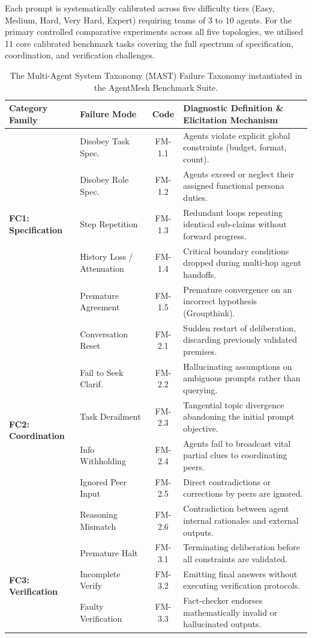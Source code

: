 \documentclass[conference]{IEEEtran}
\newcommand{\fm}[1]{\textsf{FM-#1}} %
\newcommand{\fc}[1]{\textsf{FC#1}}  %
\begin{document}
Each prompt is systematically calibrated across five difficulty tiers (Easy, Medium, Hard, Very Hard, Expert) requiring teams of 3 to 10 agents. For the primary controlled comparative experiments across all five topologies, we utilised 11 core calibrated benchmark tasks covering the full spectrum of specification, coordination, and verification challenges.

\begin{table}[t]
\centering
\small
\caption{The Multi-Agent System Taxonomy (MAST) Failure Taxonomy instantiated in the AgentMesh Benchmark Suite.}
\label{tab:taxonomy_overview}
\begin{tabularx}{\textwidth}{llcX}
\toprule
\textbf{Category Family} & \textbf{Failure Mode} & \textbf{Code} & \textbf{Diagnostic Definition \& Elicitation Mechanism} \\
\midrule
\multirow{5}{*}{\textbf{\fc{1}: Specification}} 
  & Disobey Task Spec.     & \fm{1.1} & Agents violate explicit global constraints (budget, format, count). \\
  & Disobey Role Spec.     & \fm{1.2} & Agents exceed or neglect their assigned functional persona duties. \\
  & Step Repetition        & \fm{1.3} & Redundant loops repeating identical sub-claims without forward progress. \\
  & History Loss / Attenuation & \fm{1.4} & Critical boundary conditions dropped during multi-hop agent handoffs. \\
  & Premature Agreement    & \fm{1.5} & Premature convergence on an incorrect hypothesis (Groupthink). \\
\midrule
\multirow{6}{*}{\textbf{\fc{2}: Coordination}} 
  & Conversation Reset     & \fm{2.1} & Sudden restart of deliberation, discarding previously validated premises. \\
  & Fail to Seek Clarif.   & \fm{2.2} & Hallucinating assumptions on ambiguous prompts rather than querying. \\
  & Task Derailment        & \fm{2.3} & Tangential topic divergence abandoning the initial prompt objective. \\
  & Info Withholding       & \fm{2.4} & Agents fail to broadcast vital partial clues to coordinating peers. \\
  & Ignored Peer Input     & \fm{2.5} & Direct contradictions or corrections by peers are ignored. \\
  & Reasoning Mismatch     & \fm{2.6} & Contradiction between agent internal rationales and external outputs. \\
\midrule
\multirow{3}{*}{\textbf{\fc{3}: Verification}} 
  & Premature Halt         & \fm{3.1} & Terminating deliberation before all constraints are validated. \\
  & Incomplete Verify      & \fm{3.2} & Emitting final answers without executing verification protocols. \\
  & Faulty Verification    & \fm{3.3} & Fact-checker endorses mathematically invalid or hallucinated outputs. \\
\bottomrule
\end{tabularx}
\end{table}
\end{document}
